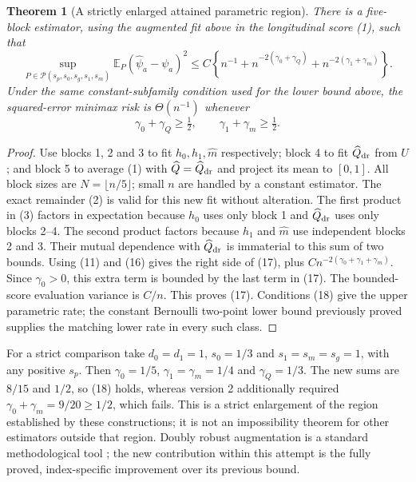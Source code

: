 \documentclass[11pt]{article}
\newtheorem{theorem}{Theorem}
\theoremstyle{definition}
\begin{document}
\begin{theorem}[A strictly enlarged attained parametric region]
There is a five-block estimator, using the augmented fit above in the
longitudinal score (1), such that
\[
 \sup_{P\in\mathcal P(s_p,s_0,s_g,s_1,s_m)}
 \mathbb E_P(\widehat\psi_a-\psi_a)^2
 \le C\left\{n^{-1}+n^{-2(\gamma_0+\gamma_Q)}
                       +n^{-2(\gamma_1+\gamma_m)}\right\}.
                                                        \tag{17}
\]
Under the same constant-subfamily condition used for the lower bound
above, the squared-error minimax risk is $\Theta(n^{-1})$ whenever
\[
 \gamma_0+\gamma_Q\ge\tfrac12,\qquad
 \gamma_1+\gamma_m\ge\tfrac12.                         \tag{18}
\]
\end{theorem}
\begin{proof}
Use blocks 1, 2 and 3 to fit $h_0,h_1,\widehat m$ respectively;
block 4 to fit $\widehat Q_{\rm dr}$ from $U$; and block 5 to
average (1) with $\widehat Q=\widehat Q_{\rm dr}$ and project its
mean to $[0,1]$. All block sizes are $N=\lfloor n/5\rfloor$;
small $n$ are handled by a constant estimator.
The exact remainder (2) is valid for this new fit without alteration.
The first product in (3) factors in expectation because $h_0$ uses
only block 1 and $\widehat Q_{\rm dr}$ uses only blocks 2--4.
The second product factors because $h_1$ and $\widehat m$ use
independent blocks 2 and 3. Their mutual dependence with
$\widehat Q_{\rm dr}$ is immaterial to this sum of two bounds.
Using (11) and (16) gives the right side of (17), plus
$C n^{-2(\gamma_0+\gamma_1+\gamma_m)}$.
Since $\gamma_0>0$, this extra term is bounded by the last term in
(17). The bounded-score evaluation variance is $C/n$.
This proves (17). Conditions (18) give the upper parametric rate;
the constant Bernoulli two-point lower bound previously proved supplies
the matching lower rate in every such class.
\end{proof}

For a strict comparison take $d_0=d_1=1$,
$s_0=1/3$ and $s_1=s_m=s_g=1$, with any positive $s_p$.
Then $\gamma_0=1/5$, $\gamma_1=\gamma_m=1/4$ and
$\gamma_Q=1/3$. The new sums are $8/15$ and $1/2$, so (18)
holds, whereas version 2 additionally required
$\gamma_0+\gamma_m=9/20\ge1/2$, which fails.
This is a strict enlargement of the region established by these
constructions; it is not an impossibility theorem for other estimators
outside that region. Doubly robust augmentation is a standard methodological tool
\cite{bang}; the new contribution within this attempt is the
fully proved, index-specific improvement over its previous bound.
\end{document}
